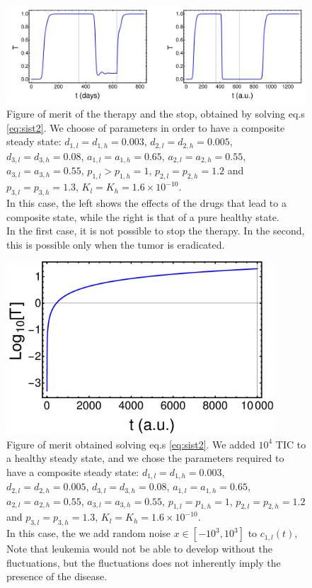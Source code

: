 \documentclass[a4paper,10pt]{article}
\begin{document}
\begin{figure}
\centering
\includegraphics[width=13cm] {stop-terapia-caso-regolated.pdf}
\caption{Figure of merit of the therapy and the stop, obtained by
solving eq.s \eqref{eq:sist2}. We choose of parameters in order to have a 
composite steady state: 
$d_{1,l}=d_{1,h}=0.003$, $d_{2,l}=d_{2,h}=0.005$,
$d_{3,l}=d_{3,h}=0.08$, $a_{1,l}=a_{1,h}=0.65$, $a_{2,l}=a_{2,h}=0.55$, 
$a_{3,l}=a_{3,h}=0.55$, $p_{1,l}>p_{1,h}=1$, $p_{2,l}=p_{2,h}=1.2$ and
$p_{3,l}=p_{3,h}=1.3$, $K_{l}=K_{h}=1.6\times 10^{-10}$.\\
In this case, the left shows the effects of the drugs that lead to a composite state, while
the right is that of a pure healthy state.\\
In the first case, it is not possible to stop the therapy. In the second,
this is possible only when the tumor is eradicated.}
\label{fig:stop-pure-l}
\end{figure}
\begin{figure}
\centering
\includegraphics[width=10cm ]{blast-fluct.pdf}
\caption{Figure of merit obtained solving eq.s \eqref{eq:sist2}.
We added $10^4$ TIC to a healthy steady state, and we chose the parameters required to have a 
composite steady state: 
$d_{1,l}=d_{1,h}=0.003$, $d_{2,l}=d_{2,h}=0.005$,
$d_{3,l}=d_{3,h}=0.08$, $a_{1,l}=a_{1,h}=0.65$, $a_{2,l}=a_{2,h}=0.55$, 
$a_{3,l}=a_{3,h}=0.55$, $p_{1,l}=p_{1,h}=1$, $p_{2,l}=p_{2,h}=1.2$ and
$p_{3,l}=p_{3,h}=1.3$, $K_{l}=K_{h}=1.6\times 10^{-10}$.\\
In this case, the we add random noise $x\in[-10^3,10^3]$ to $c_{1,l}(t)$,
Note that leukemia would not be able to develop without the fluctuations, 
but the fluctuations does not inherently imply the presence of the disease. }
\label{fig:fluctuations}
\end{figure}
\end{document}
